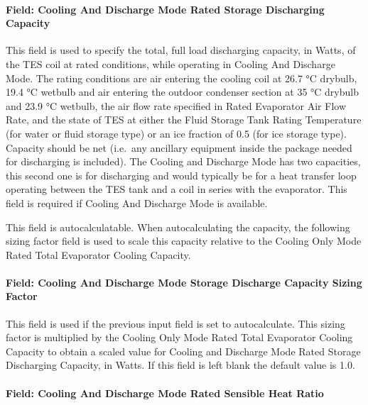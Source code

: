 \paragraph{Field: Cooling And Discharge Mode Rated Storage Discharging Capacity}\label{field-cooling-and-discharge-mode-rated-storage-discharging-capacity}

This field is used to specify the total, full load discharging capacity, in Watts, of the TES coil at rated conditions, while operating in Cooling And Discharge Mode. The rating conditions are air entering the cooling coil at 26.7 °C drybulb, 19.4 °C wetbulb and air entering the outdoor condenser section at 35 °C drybulb and 23.9 °C wetbulb, the air flow rate specified in Rated Evaporator Air Flow Rate, and the state of TES at either the Fluid Storage Tank Rating Temperature (for water or fluid storage type) or an ice fraction of 0.5 (for ice storage type). Capacity should be net (i.e.~any ancillary equipment inside the package needed for discharging is included). The Cooling and Discharge Mode has two capacities, this second one is for discharging and would typically be for a heat transfer loop operating between the TES tank and a coil in series with the evaporator. This field is required if Cooling And Discharge Mode is available.

This field is autocalculatable. When autocalculating the capacity, the following sizing factor field is used to scale this capacity relative to the Cooling Only Mode Rated Total Evaporator Cooling Capacity.

\paragraph{Field: Cooling And Discharge Mode Storage Discharge Capacity Sizing Factor}\label{field-cooling-and-discharge-mode-storage-discharge-capacity-sizing-factor}

This field is used if the previous input field is set to autocalculate. This sizing factor is multiplied by the Cooling Only Mode Rated Total Evaporator Cooling Capacity to obtain a scaled value for Cooling and Discharge Mode Rated Storage Discharging Capacity, in Watts. If this field is left blank the default value is 1.0.

\paragraph{Field: Cooling And Discharge Mode Rated Sensible Heat Ratio}\label{field-cooling-and-discharge-mode-rated-sensible-heat-ratio}

